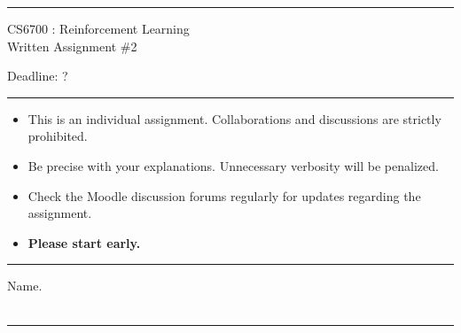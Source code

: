 \documentclass[solution,addpoints,12pt]{exam}
\begin{document}
\hrule
\vspace{1mm}
\noindent 
\begin{center}
{\Large CS6700 : Reinforcement Learning} \\
{\large Written Assignment \#2}
\end{center}
\vspace{1mm}
\noindent 
{Deadline: ?}

\vspace{2mm}
\hrule

{\small

\begin{itemize}\itemsep0mm
\item This is an individual assignment. Collaborations and discussions are strictly
prohibited.
\item Be precise with your explanations. Unnecessary verbosity will be penalized.
\item Check the Moodle discussion forums regularly for updates regarding the assignment.
\item \textbf{Please start early.}

\end{itemize}
}

\hrule

\vspace{3mm}
 Name. \\[1mm]
 \\
\hrule
\end{document}
